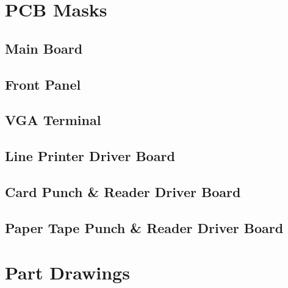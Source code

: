 \documentclass{book}
\begin{document}
\chapter{PCB Masks}
\section{Main Board}
\clearpage
\section{Front Panel}
\clearpage
\section{VGA Terminal}
\clearpage
\section{Line Printer Driver Board}
\clearpage
\section{Card Punch \& Reader Driver Board}
\clearpage
\section{Paper Tape Punch \& Reader Driver Board}
\chapter{Part Drawings}
\backmatter


\end{document}
